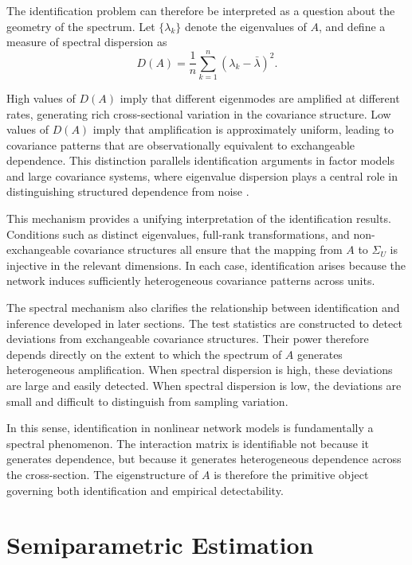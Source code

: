 \documentclass[12pt]{article}
\numberwithin{equation}{section}
\begin{document}
The identification problem can therefore be interpreted as a question about the geometry of the spectrum. Let $\{\lambda_k\}$ denote the eigenvalues of $A$, and define a measure of spectral dispersion as
\begin{equation}
D(A)
=
\frac{1}{n}
\sum_{k=1}^n
(\lambda_k - \bar{\lambda})^2.
\label{eq:spec_dispersion}
\end{equation}

High values of $D(A)$ imply that different eigenmodes are amplified at different rates, generating rich cross-sectional variation in the covariance structure. Low values of $D(A)$ imply that amplification is approximately uniform, leading to covariance patterns that are observationally equivalent to exchangeable dependence. This distinction parallels identification arguments in factor models and large covariance systems, where eigenvalue dispersion plays a central role in distinguishing structured dependence from noise \citep{bai2003inferential, fan2013large}.

This mechanism provides a unifying interpretation of the identification results. Conditions such as distinct eigenvalues, full-rank transformations, and non-exchangeable covariance structures all ensure that the mapping from $A$ to $\Sigma_U$ is injective in the relevant dimensions. In each case, identification arises because the network induces sufficiently heterogeneous covariance patterns across units.

The spectral mechanism also clarifies the relationship between identification and inference developed in later sections. The test statistics are constructed to detect deviations from exchangeable covariance structures. Their power therefore depends directly on the extent to which the spectrum of $A$ generates heterogeneous amplification. When spectral dispersion is high, these deviations are large and easily detected. When spectral dispersion is low, the deviations are small and difficult to distinguish from sampling variation.

In this sense, identification in nonlinear network models is fundamentally a spectral phenomenon. The interaction matrix is identifiable not because it generates dependence, but because it generates heterogeneous dependence across the cross-section. The eigenstructure of $A$ is therefore the primitive object governing both identification and empirical detectability.


\section{Semiparametric Estimation}
\end{document}
